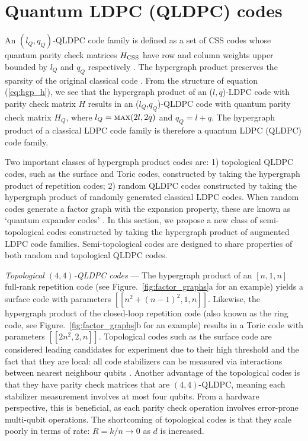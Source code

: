\documentclass[%
 reprint,
superscriptaddress,
nofootinbib,
 amsmath,amssymb,
secnumarabic
]{revtex4-1}
\newcommand*{\etc}[1]{{#1}}
\begin{document}
\section{Quantum LDPC (QLDPC) codes}\label{sec:qldpc}

An  $(l_Q,q_Q)$-QLDPC code family is defined as a set of CSS codes whose quantum parity check matrices $H_{\rm CSS}$ have row and column weights upper bounded by $l_Q$ and $q_Q$ respectively \cite{mackay2004sparse}. \etc{The hypergraph product preserves the sparsity of the original classical code} \cite{tillich2013quantum}.  From the structure of equation (\ref{eq:hgp_h}), we see that the hypergraph product of an ($l,q$)-LDPC code with parity check matrix $H$ results in an ($l_Q$,$q_Q$)-QLDPC code with quantum parity check matrix $H_Q$, where $l_Q=\text{\sc max}(2l,2q)$ and $q_Q=l+q$.  The hypergraph product of a classical LDPC code family is therefore a quantum LDPC (QLDPC) code family.

\etc{Two important classes of hypergraph product codes are:} 1) topological QLDPC codes, such as the surface and Toric codes, constructed by taking the hypergraph product of repetition codes; 2) random QLDPC codes constructed by taking the hypergraph product of randomly generated classical LDPC codes. When random codes generate a factor graph with the expansion property, these are known as `quantum expander codes' \cite{leverrier2015quantum,fawzi2018constant,fawzi2018efficient}. In this section, we propose a new class of semi-topological codes constructed by taking the hypergraph product of augmented LDPC code families. Semi-topological codes are designed to share properties of both random and topological QLDPC codes.           


\textit{Topological $(4,4)$-QLDPC codes} --- The hypergraph product of an $[n,1,n]$ full-rank repetition code (see Figure.~\ref{fig:factor_graphs}a for an example) yields a surface code with parameters $[[n^2+(n-1)^2,1,n]]$. Likewise, the hypergraph product of the closed-loop repetition code (also known as the ring code, see Figure.~\ref{fig:factor_graphs}b for an example) results in a Toric code with parameters $[[2n^2,2,n]]$. Topological codes such as the surface code are considered leading candidates for experiment due to their high threshold \cite{Dennis02} and the fact that they are local: all code stabilizers can be measured via interactions between nearest neighbour qubits \cite{Fowler12}. Another advantage of the topological codes is that they have parity check matrices that are $(4,4)$-QLDPC, meaning each stabilizer measurement involves at most four qubits. From a hardware perspective, this is beneficial, \etc{as each parity check operation} involves error-prone multi-qubit operations. The shortcoming of topological codes is that they scale poorly in terms of rate: $R=k/n \rightarrow 0$ as $d$ is increased.
\end{document}
